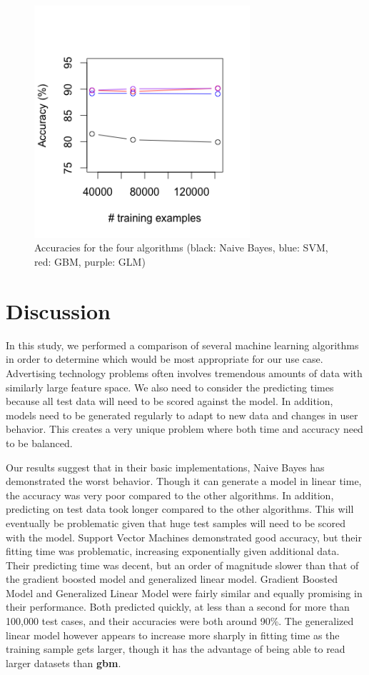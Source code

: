 \documentclass[twoside]{article}
\begin{document}
\begin{multicols}{2}
\begin{figure}[H]
 \caption{Accuracies for the four algorithms (black: Naive Bayes, blue: SVM, red: GBM, purple: GLM)}
  \centering
    \includegraphics[width=8cm]{../data/all_acc}
\end{figure}


\section{Discussion}

In this study, we performed a comparison of several machine learning algorithms in order to determine which would be most appropriate for our use case. Advertising technology problems often involves tremendous amounts of data with similarly large feature space. We also need to consider the predicting times because all test data will need to be scored against the model. In addition, models need to be generated regularly to adapt to new data and changes in user behavior. This creates a very unique problem where both time and accuracy need to be balanced.

Our results suggest that in their basic implementations, Naive Bayes has demonstrated the worst behavior. Though it can generate a model in linear time, the accuracy was very poor compared to the other algorithms. In addition, predicting on test data took longer compared to the other algorithms. This will eventually be problematic given that huge test samples will need to be scored with the model. Support Vector Machines demonstrated good accuracy, but their fitting time was problematic, increasing exponentially given additional data. Their predicting time was decent, but an order of magnitude slower than that of the gradient boosted model and generalized linear model. Gradient Boosted Model and Generalized Linear Model were fairly similar and equally promising in their performance. Both predicted quickly, at less than a second for more than 100,000 test cases, and their accuracies were both around 90\%. The generalized linear model however appears to increase more sharply in fitting time as the training sample gets larger, though it has the advantage of being able to read larger datasets than \textbf{gbm}.


\end{multicols}
\end{document}
